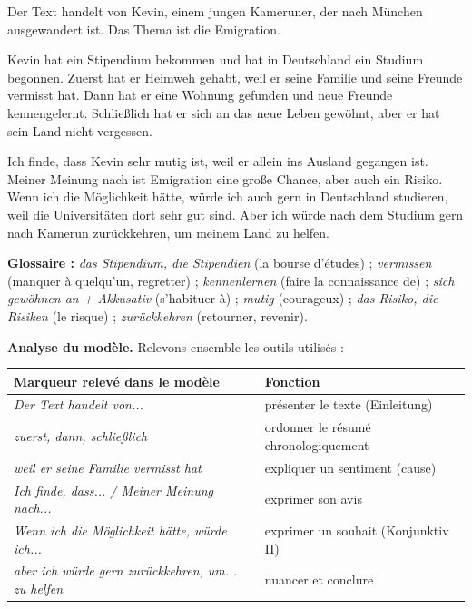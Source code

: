 \documentclass[11pt]{article}
\newcommand{\all}[1]{\ifmmode\text{\textit{#1}}\else\begingroup\selectlanguage{ngerman}\itshape #1\endgroup\fi}
\begin{document}
\begin{textebox}
Der Text handelt von Kevin, einem jungen Kameruner, der nach München ausgewandert ist. Das Thema ist die Emigration.

Kevin hat ein Stipendium bekommen und hat in Deutschland ein Studium begonnen. Zuerst hat er Heimweh gehabt, weil er seine Familie und seine Freunde vermisst hat. Dann hat er eine Wohnung gefunden und neue Freunde kennengelernt. Schließlich hat er sich an das neue Leben gewöhnt, aber er hat sein Land nicht vergessen.

Ich finde, dass Kevin sehr mutig ist, weil er allein ins Ausland gegangen ist. Meiner Meinung nach ist Emigration eine große Chance, aber auch ein Risiko. Wenn ich die Möglichkeit hätte, würde ich auch gern in Deutschland studieren, weil die Universitäten dort sehr gut sind. Aber ich würde nach dem Studium gern nach Kamerun zurückkehren, um meinem Land zu helfen.
\end{textebox}

\textbf{Glossaire :} \emph{das Stipendium, die Stipendien} (la bourse d'études) ; \emph{vermissen} (manquer à quelqu'un, regretter) ; \emph{kennenlernen} (faire la connaissance de) ; \emph{sich gewöhnen an + Akkusativ} (s'habituer à) ; \emph{mutig} (courageux) ; \emph{das Risiko, die Risiken} (le risque) ; \emph{zurückkehren} (retourner, revenir).

\medskip
\textbf{Analyse du modèle.} Relevons ensemble les outils utilisés :

\begin{center}
\begin{tabularx}{\linewidth}{|X|X|}
\hline
\rowcolor{popblueL} Marqueur relevé dans le modèle & Fonction \\
\hline
\all{Der Text handelt von...} & présenter le texte (Einleitung) \\
\hline
\all{zuerst, dann, schließlich} & ordonner le résumé chronologiquement \\
\hline
\all{weil er seine Familie vermisst hat} & expliquer un sentiment (cause) \\
\hline
\all{Ich finde, dass...} / \all{Meiner Meinung nach...} & exprimer son avis \\
\hline
\all{Wenn ich die Möglichkeit hätte, würde ich...} & exprimer un souhait (Konjunktiv II) \\
\hline
\all{aber ich würde gern zurückkehren, um... zu helfen} & nuancer et conclure \\
\hline
\end{tabularx}
\end{center}
\end{document}
